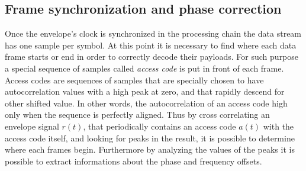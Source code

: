 
\subsection{Frame synchronization and phase correction}

Once the envelope's clock is synchronized in the processing chain the data stream has one sample per symbol. At this point it is necessary to find where each data frame starts or end in order to correctly decode their payloads. For such purpose a special sequence of samples called \emph{access code} is put in front of each frame. Access codes are sequences of samples that are specially chosen to have autocorrelation values with a high peak at zero, and that rapidly descend for other shifted value. In other words, the autocorrelation of an access code high only when the sequence is perfectly aligned. Thus by cross correlating an envelope signal \(r(t)\), that periodically contains an access code \(a(t)\) with the access code itself, and looking for peaks in the result, it is possible to determine where each frames begin. Furthermore by analyzing the values of the peaks it is possible to extract informations about the phase and frequency offsets.

